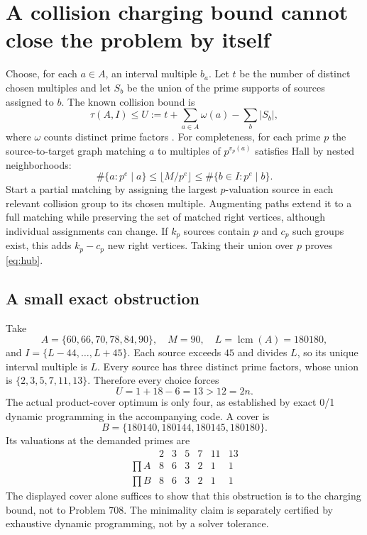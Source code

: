 \documentclass[11pt,a4paper]{article}
\theoremstyle{remark}
\DeclareMathOperator{\lcm}{lcm}
\begin{document}
\section{A collision charging bound cannot close the problem by itself}
Choose, for each $a\in A$, an interval multiple $b_a$. Let $t$ be the
number of distinct chosen multiples and let $S_b$ be the union of the
prime supports of sources assigned to $b$. The known collision bound is
\begin{equation}\label{eq:hub}
 \tau(A,I)\le U:=t+\sum_{a\in A}\omega(a)-\sum_b|S_b|,
\end{equation}
where $\omega$ counts distinct prime factors \cite{chen,preil}.
For completeness, for each prime $p$ the source-to-target graph matching
$a$ to multiples of $p^{v_p(a)}$ satisfies Hall by nested neighborhoods:
\[
 \#\{a:p^e\mid a\}\le\lfloor M/p^e\rfloor
 \le\#\{b\in I:p^e\mid b\}.
\]
Start a partial matching by assigning the largest $p$-valuation source
in each relevant collision group to its chosen multiple. Augmenting
paths extend it to a full matching while preserving the set of matched
right vertices, although individual assignments can change. If $k_p$
sources contain $p$ and $c_p$ such groups exist, this adds $k_p-c_p$
new right vertices. Taking their union over $p$ proves \eqref{eq:hub}.

\subsection{A small exact obstruction}
Take
\[
 A=\{60,66,70,78,84,90\},\quad M=90,\quad L=\lcm(A)=180180,
\]
and $I=\{L-44,\ldots,L+45\}$. Each source exceeds $45$ and divides
$L$, so its unique interval multiple is $L$. Every source has three
distinct prime factors, whose union is $\{2,3,5,7,11,13\}$. Therefore
every choice forces
\[
 U=1+18-6=13>12=2n.
\]
The actual product-cover optimum is only four, as established by exact
0/1 dynamic programming in the accompanying code. A cover is
\[
 B=\{180140,180144,180145,180180\}.
\]
Its valuations at the demanded primes are
\[
\begin{array}{c|rrrrrr}
 &2&3&5&7&11&13\\\hline
 \prod A&8&6&3&2&1&1\\
 \prod B&8&6&3&2&1&1
\end{array}
\]
The displayed cover alone suffices to show that this obstruction is to
the charging bound, not to Problem 708. The minimality claim is separately
certified by exhaustive dynamic programming, not by a solver tolerance.
\end{document}
